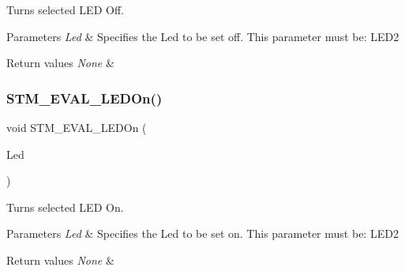 Turns selected L\+ED Off. 


\begin{DoxyParams}{Parameters}
{\em Led} & Specifies the Led to be set off. This parameter must be\+: L\+E\+D2 \\
\hline
\end{DoxyParams}

\begin{DoxyRetVals}{Return values}
{\em None} & \\
\hline
\end{DoxyRetVals}
\mbox{\label{group___s_t_m32_f1_x_x___n_u_c_l_e_o___l_o_w___l_e_v_e_l___private___functions_gad27fa430d867e6dde94cb7896fcc42fc}} 
\subsubsection{\texorpdfstring{STM\_EVAL\_LEDOn()}{STM\_EVAL\_LEDOn()}}
{\footnotesize\ttfamily void S\+T\+M\+\_\+\+E\+V\+A\+L\+\_\+\+L\+E\+D\+On (\begin{DoxyParamCaption}\item[{\mbox{\hyperlink{group___s_t_m32_f1_x_x___n_u_c_l_e_o___l_o_w___l_e_v_e_l___exported___types_gaa059704b7ca945eb9c1e7f2c3d03fecd}{Led\+\_\+\+Type\+Def}}}]{Led }\end{DoxyParamCaption})}



Turns selected L\+ED On. 


\begin{DoxyParams}{Parameters}
{\em Led} & Specifies the Led to be set on. This parameter must be\+: L\+E\+D2 \\
\hline
\end{DoxyParams}

\begin{DoxyRetVals}{Return values}
{\em None} & \\
\hline
\end{DoxyRetVals}
\mbox{\label{group___s_t_m32_f1_x_x___n_u_c_l_e_o___l_o_w___l_e_v_e_l___private___functions_ga5b1ccd57cf505c1d41440e62a845e4a9}} 
